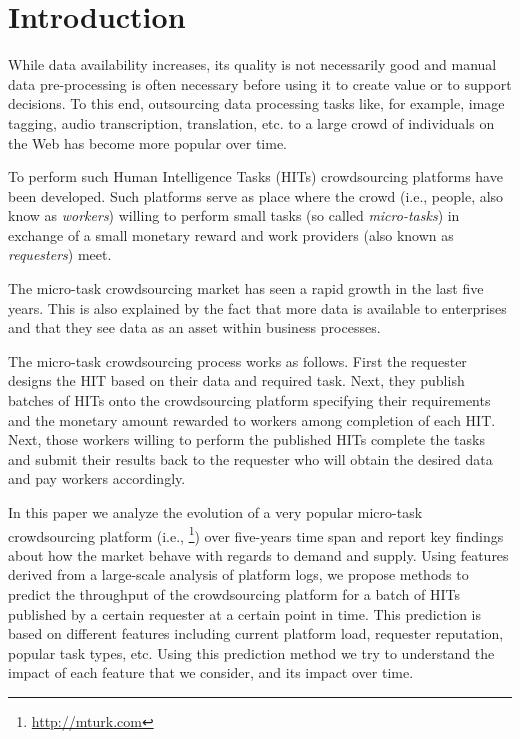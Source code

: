 \section{Introduction}\label{sec:intro}
% 
While data  availability increases, its quality is not necessarily good and manual data pre-processing is often necessary before using it to create value or to support decisions.
% 
To this end, outsourcing  data processing tasks  like, for example, image tagging, audio transcription, translation, etc. to a large crowd of individuals on the Web has become more popular over time.

To perform such Human Intelligence Tasks (HITs) crowdsourcing platforms have been developed. Such platforms serve as place where the crowd (i.e., people, also know as \emph{workers}) willing to perform small tasks (so called \emph{micro-tasks}) in exchange of a small monetary reward and work providers (also known as \emph{requesters}) meet. 

The micro-task crowdsourcing market has seen a rapid growth in the last five years. This is also explained by the fact that more data is available to enterprises and that they see data as an asset within business processes.

The  micro-task crowdsourcing process works as follows. First the requester designs the HIT based on their data and required task. Next, they publish batches of HITs onto the crowdsourcing platform specifying their requirements and the monetary amount rewarded to workers among completion of each HIT. Next, those workers willing to perform the published HITs complete the tasks and submit their results back to the requester who will obtain the desired data and pay workers accordingly.

In this paper we analyze the evolution of a very popular micro-task crowdsourcing platform (i.e., \amt{}\footnote{\url{http://mturk.com}}) over  five-years time span and report key findings about how
the market behave with regards to demand and supply.
% 
Using features derived from a large-scale analysis of platform logs, we propose methods to predict the throughput of the crowdsourcing platform for a batch of HITs published by a certain requester at a certain point in time. This prediction is based on different features including current platform load, requester reputation, popular task types, etc. Using this prediction method we try to understand the impact of each feature that we consider, and its impact over time.

